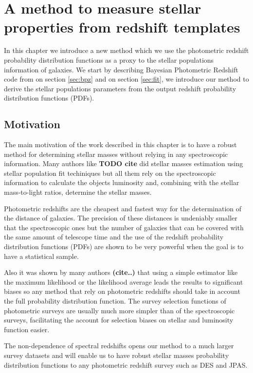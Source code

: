 \documentclass[9pt]{memoir}
\begin{document}
\chapter{A method to measure stellar properties from redshift templates}

In this chapter we introduce a new method which we use the photometric redshift probability distribution functions as a proxy to the stellar populations information of galaxies. We start by describing Bayesian Photometric Redshift code from \cite{Benitez.2000a} on section \ref{sec:bpz} and on section \ref{sec:fit}, we introduce our method to derive the stellar populations parameters from the output redshift probability distribution functions (PDFs).


\section{Motivation}
\label{sec:motivation}

The main motivation of the work described in this chapter is to have a robust method for determining stellar masses without relying in any spectroscopic information. Many authors like \textbf{TODO cite} did stellar masses estimation using stellar population fit techiniques but all them rely on the spectroscopic information to calculate the objects luminosity and, combining with the stellar mass-to-light ratios, determine the stellar masses. 

Photometric redshifts are the cheapest and fastest way for the determination of the distance of galaxies. The precision of these distances is undeniably smaller that the spectroscopic ones but the number of galaxies that can be covered with the same amount of telescope time and the use of the redshift probability distribution functions (PDFs) are shown to be very powerful when the goal is to have a statistical sample.

Also it was shown by many authors \textbf{(cite..)} that using a simple estimator like the maximum likelihood or the likelihood average leads the results to significant biases so any method that rely on photometric redshifts should take in account the full probability distribution function. The survey selection functions of photometric surveys are usually much more simpler than of the spectroscopic surveys, facilitating the account for selection biases on stellar and luminosity function easier.

The non-dependence of spectral redshifts opens our method to a much larger survey datasets and will enable us to have robust stellar masses probability distribution functions to any photometric redshift survey such as DES and JPAS.
\end{document}
